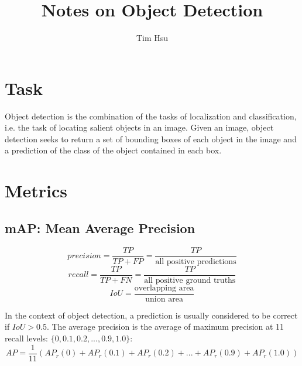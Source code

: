 \documentclass[12pt]{article}
\begin{document}
	
	
	
	\title{Notes on Object Detection}%
	\author{Tim Hsu} %
	\date{}
	\maketitle
	
	\section*{Task}
	Object detection is the combination of the tasks of localization and classification, i.e. the task of locating salient objects in an image. Given an image, object detection seeks to return a set of bounding boxes of each object in the image and a prediction of the class of the object contained in each box.
	
	\section*{Metrics}
	\subsection*{mAP: Mean Average Precision}
	\[precision = \frac{TP}{TP+FP}=\frac{TP}{\textrm{all positive predictions}}\]
	\[recall = \frac{TP}{TP+FN}=\frac{TP}{\textrm{all positive ground truths}}\]
	\[IoU = \frac{\textrm{overlapping area}}{\textrm{union area}}\]
	
	In the context of object detection, a prediction is usually considered to be correct if $IoU > 0.5$. The average precision is the average of maximum precision at 11 recall levels: $\{0, 0.1, 0.2,...,0.9, 1.0\}$:
	\[AP = \frac{1}{11}\left(AP_r(0)+AP_r(0.1)+AP_r(0.2)+...+AP_r(0.9)+AP_r(1.0)\right)\]
	
\end{document}
